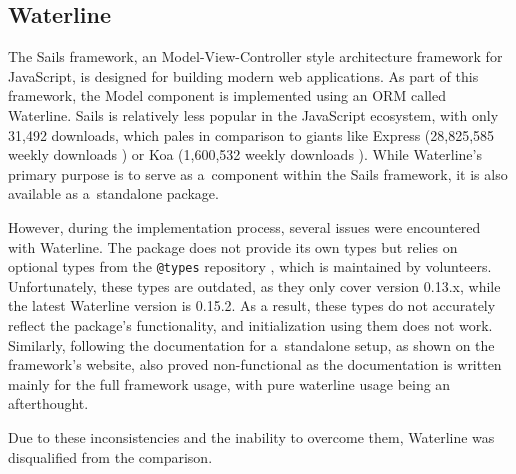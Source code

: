 \subsection{Waterline}\label{ch:waterline}

The Sails framework, an Model-View-Controller style \cite[p.
330]{fowler-patterns-2003} architecture framework for JavaScript, is designed
for building modern web applications. As part of this framework, the Model
component is implemented using an ORM called Waterline. Sails is relatively less
popular in the JavaScript ecosystem, with only 31,492 downloads, which pales in
comparison to giants like Express (28,825,585 weekly downloads
\cite{express_2022}) or Koa (1,600,532 weekly downloads \cite{koa_2023}). While
Waterline's primary purpose is to serve as a~component within the Sails
framework, it is also available as a~standalone package.

However, during the implementation process, several issues were encountered with
Waterline. The package does not provide its own types but relies on optional
types from the \texttt{@types} repository \cite{definitelytyped/types/waterline}, which
is maintained by volunteers. Unfortunately, these types are outdated, as they
only cover version 0.13.x, while the latest Waterline version is 0.15.2. As a
result, these types do not accurately reflect the package's functionality, and
initialization using them does not work. Similarly, following the documentation
for a~standalone setup, as shown on the framework's website, also proved
non-functional as the documentation \cite{waterline-docs} is written mainly for
the full framework usage, with pure waterline usage being an afterthought.

Due to these inconsistencies and the inability to overcome them, Waterline was
disqualified from the comparison.